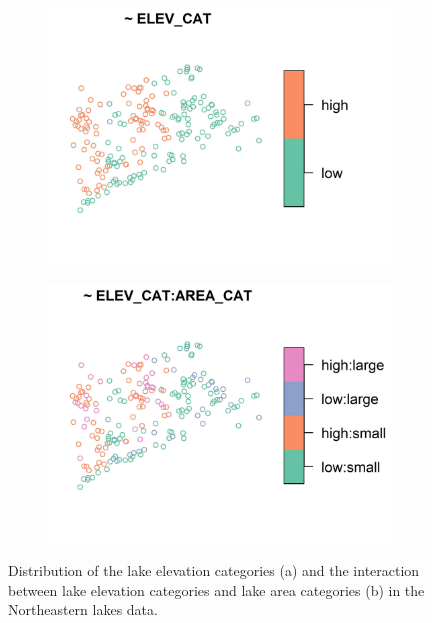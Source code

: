 \documentclass[
  shortnames]{jss}
\begin{document}
\begin{figure}
\centering
\begin{subfigure}{0.49\textwidth}
  \includegraphics[width = 1\linewidth]{images/elevcat.jpeg}
  \caption{}
  \label{fig:elevcat}
\end{subfigure}
\begin{subfigure}{0.49\textwidth}
  \includegraphics[width = 1\linewidth]{images/elevcat_areacat.jpeg}
  \caption{}
  \label{fig:areacat}
\end{subfigure} 
\caption{Distribution of the lake elevation categories (a) and the interaction between lake elevation categories and lake area categories (b) in the Northeastern lakes data.}
\label{fig:sframes1}
\end{figure}
\end{document}
